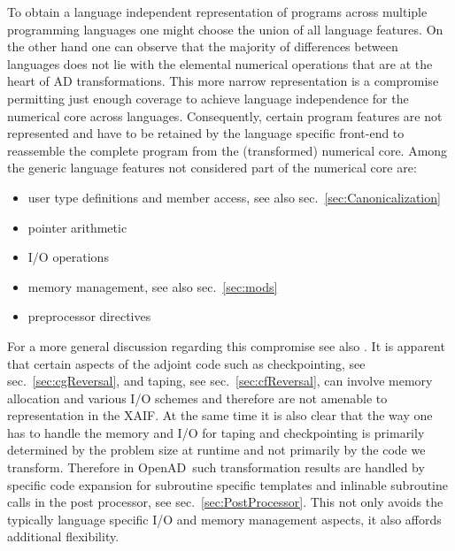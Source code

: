 \documentclass{book}
\newcommand{\OpenAD}{OpenAD}
\newcommand{\xaif}{XAIF}
\newcommand{\refsec}[1]{{sec.~\ref{#1}}}
\begin{document}
To obtain a language independent representation of programs across multiple 
programming languages one might choose the union of all language features. 
On the other hand one can observe that the majority of differences between 
languages does not lie with the elemental numerical operations that are at the 
heart of AD transformations. This more narrow representation 
is a compromise permitting just enough coverage to achieve language 
independence for the numerical core across languages.
Consequently, certain program features are not represented and have 
to be retained by the language specific front-end to reassemble the 
complete program from the (transformed) numerical core.
Among the generic language features not considered part of the numerical core are: 
\begin{itemize}
  \parskip = -2pt
\item user type definitions and member access, see also \refsec{sec:Canonicalization}
\item pointer arithmetic
\item I/O operations  
\item memory management, see also \refsec{sec:mods}
\item preprocessor directives
\end{itemize}
For a more general discussion regarding this compromise see also \cite{Utke2004SLD}.
It is apparent that certain aspects of the adjoint code such as 
checkpointing, see \refsec{sec:cgReversal}, and taping, see \refsec{sec:cfReversal},
can involve memory allocation and various I/O schemes and therefore 
are not amenable to representation in the \xaif. 
At the same time it is also clear that the way  one has to handle the memory and I/O for 
taping and checkpointing is primarily determined by the problem size at runtime and not
primarily by the code we transform.   
Therefore in \OpenAD\ such transformation results are handled by  specific 
code expansion for subroutine specific templates and inlinable subroutine calls 
in the post processor, see \refsec{sec:PostProcessor}. This not only avoids 
the typically language specific I/O and memory management aspects, it also 
affords additional flexibility.   
\end{document}
